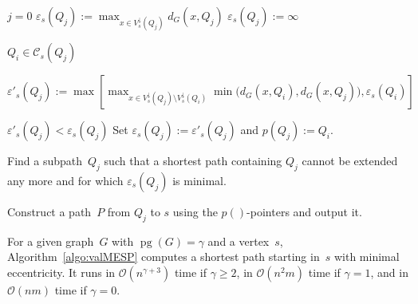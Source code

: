\documentclass[10pt]{llncs}
\newcommand{\calC}{\mathcal{C}}
\newcommand{\calO}{\mathcal{O}}
\DeclareMathOperator{\pg}{pg}
\begin{document}
\begin{algorithm}
{{        \If
        {
            $j = 0$
        }
        {
            $\displaystyle \varepsilon_s(Q_j) := \max_{x \in V^\downarrow_s(Q_j)} d_G(x, Q_j)$
            \label{line:compStartEpsilon}
        }
        \Else
        {
            $\displaystyle \varepsilon_s(Q_j) := \infty$
            \label{line:QjEpsilonInf}
        }

        \ForEach
        {
            $Q_i \in \calC_s(Q_j)$
            \label{line:QiLoop}
        }
        {
            $\displaystyle
                \varepsilon'_s(Q_j) :=
                \max \left[
                    \max_{x \in V^\downarrow_s(Q_j) \setminus V^\downarrow_s(Q_i)} \min \big( d_G(x, Q_i), d_G(x, Q_j) \big),
                    \varepsilon_s(Q_i)
                \right]
            $
            \label{line:compEpsilonPrime}

            \If
            {
                $\varepsilon'_s(Q_j) < \varepsilon_s(Q_j)$
                \label{line:comareEpsilon}
            }
            {
                Set $\varepsilon_s(Q_j) := \varepsilon'_s(Q_j)$ and $p(Q_j) := Q_i$.
                \label{line:setP}
            }
        }
    }
}

Find a subpath~$Q_j$ such that a shortest path containing $Q_j$ cannot be extended any more and for which $\varepsilon_s(Q_j)$ is minimal.
\label{line:findMinQj}

Construct a path~$P$ from $Q_j$ to $s$ using the $p()$-pointers and output it.
\label{line:constructP}
\end{algorithm}

\begin{theorem}
For a given graph~$G$ with $\pg(G) = \gamma$ and a vertex~$s$, Algorithm~\ref{algo:valMESP} computes a shortest path starting in~$s$ with minimal eccentricity.
It runs in $\calO(n^{\gamma + 3})$ time if $\gamma \geq 2$, in $\calO(n^2m)$ time if $\gamma = 1$, and in $\calO(nm)$ time if $\gamma = 0$.
\end{theorem}
\end{document}
